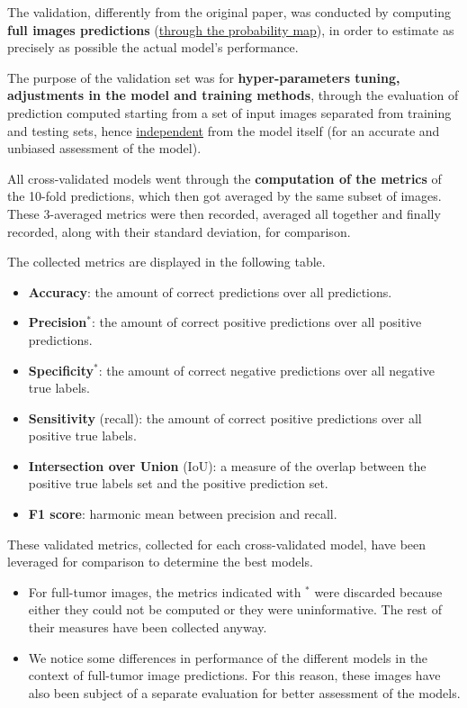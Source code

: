 \par The validation, differently from the original paper, was conducted by computing \textbf{full images predictions} (\uline{through the probability map}), in order to estimate as precisely as possible the actual model's performance.

\par
The purpose of the validation set was for \textbf{hyper-parameters tuning, adjustments in the model and training methods}, through the evaluation of prediction computed starting from a set of input images separated from training and testing sets, hence \uline{independent} from the model itself (for an accurate and unbiased assessment of the model).

\par
All cross-validated models went through the \textbf{computation of the metrics} of the 10-fold predictions, which then got averaged by the same subset of images. These 3-averaged metrics were then recorded, averaged all together and finally recorded, along with their standard deviation, for comparison.

The collected metrics are displayed in the following table.

\begin{itemize}
    \item \textbf{Accuracy}: the amount of correct predictions over all predictions.
    \item \textbf{Precision}$^*$: the amount of correct positive predictions over all positive predictions.
    \item \textbf{Specificity}$^*$: the amount of correct negative predictions over all negative true labels.
    \item \textbf{Sensitivity} (recall): the amount of correct positive predictions over all positive true labels.
    \item \textbf{Intersection over Union} (IoU): a measure of the overlap between the positive true labels set and the positive prediction set.
    \item \textbf{F1 score}: harmonic mean between precision and recall.
\end{itemize}

 These validated metrics, collected for each cross-validated model, have been leveraged for comparison to determine the best models.

 \subtitle{Remarks}
 \begin{itemize}
     \item For full-tumor images, the metrics indicated with $^*$ were discarded because either they could not be computed or they were uninformative. The rest of their measures have been collected anyway.
     \item We notice some differences in performance of the different models in the context of full-tumor image predictions. For this reason, these images have also been subject of a separate evaluation for better assessment of the models.
 \end{itemize}

